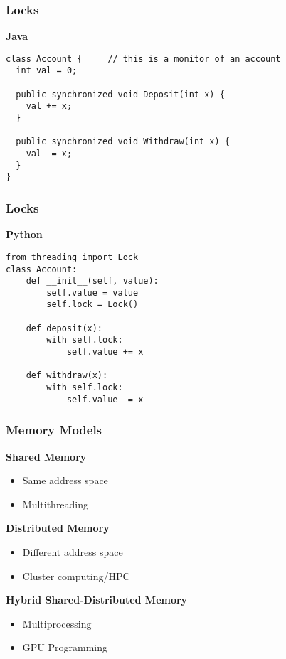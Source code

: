 \documentclass{beamer}
\begin{document}
\begin{frame}[fragile]
\frametitle{Locks}
\textbf{Java}
\begin{verbatim}
class Account {     // this is a monitor of an account
  int val = 0;
 
  public synchronized void Deposit(int x) {
    val += x;
  }
 
  public synchronized void Withdraw(int x) {
    val -= x;
  }
}
\end{verbatim}
\end{frame}

\begin{frame}[fragile]
\frametitle{Locks}
\textbf{Python}
\begin{verbatim}
from threading import Lock
class Account:
    def __init__(self, value):
        self.value = value
        self.lock = Lock()

    def deposit(x):
        with self.lock:
            self.value += x

    def withdraw(x):
        with self.lock:
            self.value -= x
\end{verbatim}
\end{frame}

\begin{frame}
\frametitle{Memory Models}
\textbf{Shared Memory}
\begin{itemize}
  \item Same address space
  \item Multithreading
\end{itemize}

\pause

\textbf{Distributed Memory}
\begin{itemize}
  \item Different address space
  \item Cluster computing/HPC
\end{itemize}

\pause

\textbf{Hybrid Shared-Distributed Memory}
\begin{itemize}
  \item Multiprocessing
  \item GPU Programming
\end{itemize}
\end{frame}

\end{document}

